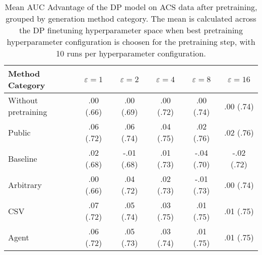 \begin{table}[h!]
    \centering
    \caption{Mean AUC Advantage of the DP model on ACS data after pretraining, grouped by generation method category. The mean is calculated across the DP finetuning hyperparameter space when best pretraining hyperparameter configuration is choosen for the pretraining step, with 10 runs per hyperparameter configuration.}
    \label{tab:epsilon_comparison}
    \begin{tabular}{lccccc}
    \toprule
    Method Category & $\varepsilon=1$ & $\varepsilon=2$ & $\varepsilon=4$ & $\varepsilon=8$ & $\varepsilon=16$ \\
    \midrule
    Without pretraining & .00 {\small (.66)} & .00 {\small (.69)} & .00 {\small (.72)} & .00 {\small (.74)} & .00 {\small (.74)} \\
    \arrayrulecolor{black!50!}\midrule
    Public & \cellcolor{silver!30}.06 {\small (.72)} & \cellcolor{gold!30}.06 {\small (.74)} & \cellcolor{gold!30}.04 {\small (.75)} & \cellcolor{gold!30}.02 {\small (.76)} & \cellcolor{gold!30}.02 {\small (.76)} \\
    \arrayrulecolor{black!50!}\midrule
    Baseline & .02 {\small (.68)} & -.01 {\small (.68)} & .01 {\small (.73)} & -.04 {\small (.70)} & -.02 {\small (.72)} \\
    \arrayrulecolor{black!50!}\midrule
    Arbitrary & .00 {\small (.66)} & .04 {\small (.72)} & .02 {\small (.73)} & -.01 {\small (.73)} & .00 {\small (.74)} \\
    \arrayrulecolor{black!50!}\midrule
    CSV & \cellcolor{gold!30}.07 {\small (.72)} & \cellcolor{silver!30}.05 {\small (.74)} & \cellcolor{silver!30}.03 {\small (.75)} & \cellcolor{silver!30}.01 {\small (.75)} & \cellcolor{silver!30}.01 {\small (.75)} \\
    Agent & \cellcolor{bronze!30}.06 {\small (.72)} & \cellcolor{bronze!30}.05 {\small (.73)} & \cellcolor{bronze!30}.03 {\small (.74)} & \cellcolor{bronze!30}.01 {\small (.75)} & \cellcolor{bronze!30}.01 {\small (.75)} \\
    \bottomrule
    \end{tabular}
\end{table}